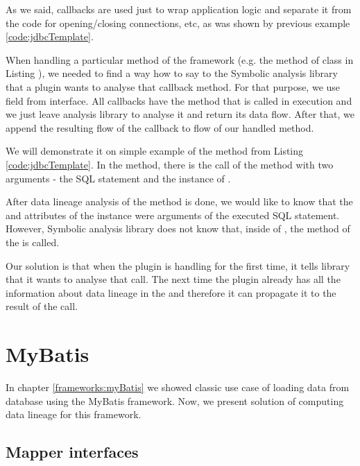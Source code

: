As we said, callbacks are used just to wrap application logic and
separate it from the code for opening/closing connections, etc,
as was shown by previous example \ref{code:jdbcTemplate}.

When handling a particular method of the framework (e.g. the 
method of  class in Listing ),
we needed to find a way how to say to the Symbolic analysis library that a plugin wants to
analyse that callback method. For that purpose, we use
field  from interface. 
All callbacks have the method that is called in execution
and we just leave analysis library to analyse it and return
its data flow. After that, we append the resulting flow of the callback
to flow of our handled method.

We will demonstrate it on simple example of the  method from Listing \ref{code:jdbcTemplate}.
In the method, there is the call of the  method
with two arguments - the SQL statement and the instance of .

After data lineage analysis of the  method is done, we would like to know
that the  and  attributes of the  instance
were arguments of the executed SQL statement.
However, Symbolic analysis library does not know that, inside of ,
the  method of the  is called.

Our solution is that when the plugin is handling
 for the first time, it tells library
that it wants to analyse that  call.
The next time the plugin already has all the information
about data lineage in the 
and therefore it can propagate it to the result of the  call.




\section{MyBatis}

In chapter \ref{frameworks:myBatis} we showed classic use case of loading data from database
using the MyBatis framework. Now, we present solution of computing data lineage for this framework.



\subsection{Mapper interfaces}

